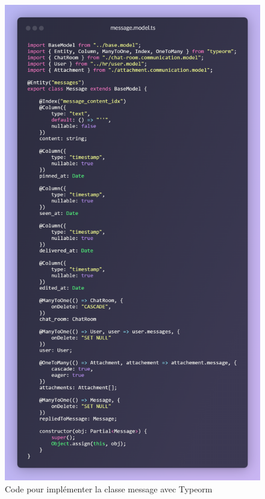 \begin{figure}[H]
    \centering
    \includegraphics[width=13.5cm]{assets/annexes/snippet (1).png}
    \caption{Code pour implémenter la classe message avec Typeorm}
\end{figure}

